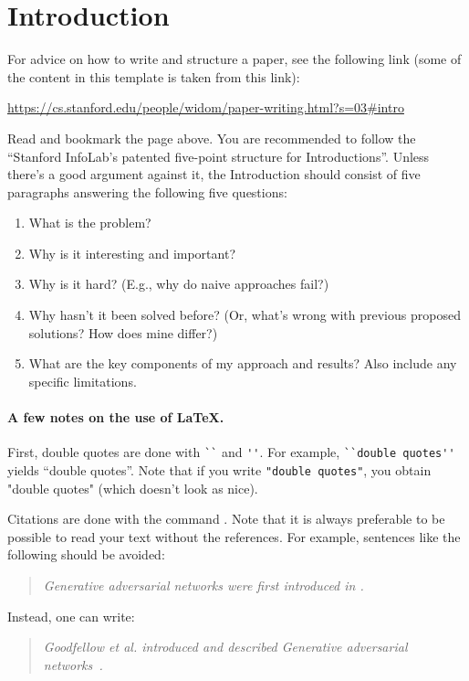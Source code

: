 \section{Introduction}

For advice on how to write and structure a paper, see the following link (some of the content in this template is taken from this link):

\url{https://cs.stanford.edu/people/widom/paper-writing.html?s=03#intro}

\medskip

Read and bookmark the page above. You are recommended to follow the ``Stanford InfoLab's patented five-point structure for Introductions''. Unless there's a good argument against it, the Introduction should consist of five paragraphs answering the following five questions:

\begin{enumerate}
\item What is the problem?
\item Why is it interesting and important?
\item Why is it hard? (E.g., why do naive approaches fail?)
\item Why hasn't it been solved before? (Or, what's wrong with previous proposed solutions? How does mine differ?)
\item What are the key components of my approach and results? Also include any specific limitations.
\end{enumerate}

\paragraph{\textbf{A few notes on the use of \LaTeX.}} 
First, double quotes are done with \verb|``| and \verb|''|. For example, \verb|``double quotes''| yields ``double quotes''. Note that if you write \verb|"double quotes"|, you obtain "double quotes" (which doesn't look as nice).

Citations are done with the \verb@\cite@ command \cite{Goodfellow:2014}. 
Note that it is always preferable to be possible to read your text without the references. For example, sentences like the following should be avoided:

\begin{quote}
\sl
Generative adversarial networks were first introduced in \cite{Goodfellow:2014}.
\end{quote}
Instead, one can write:
\begin{quote}
\sl
Goodfellow et al. introduced and described Generative adversarial networks~\cite{Goodfellow:2014}.
\end{quote}

